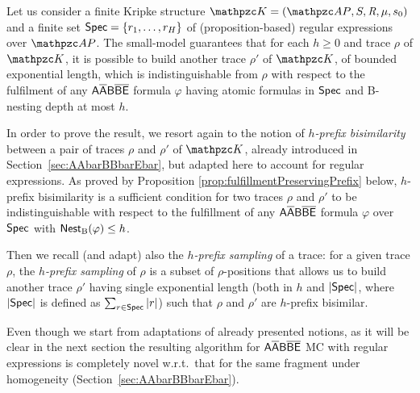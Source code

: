 Let us consider a finite Kripke structure $\Ku=\KuDef$ and a finite set $\textsf{Spec}=\{r_1,\ldots,r_H\}$ of (proposition-based)
regular expressions over $\Prop$.
The small-model guarantees that for each $h\geq 0$ and trace $\rho$ of $\Ku$,
it is possible to build another trace $\rho'$ of $\Ku$, of bounded exponential length, which is indistinguishable from $\rho$ with respect to the fulfilment of any $\mathsf{A\overline{A}B\overline{B}\overline{E}}$ formula $\varphi$ having atomic formulas in $\textsf{Spec}$ and B-nesting depth at most $h$. %

In order to prove the result, 
we resort again to the notion of
\emph{$h$-prefix bisimilarity}  between a pair of traces $\rho$ and $\rho'$ of $\Ku$,
already introduced in Section~\ref{sec:AAbarBBbarEbar}, but adapted here to account for regular expressions. 
%
As proved by Proposition \ref{prop:fulfillmentPreservingPrefix} below, $h$-prefix bisimilarity   is a sufficient condition for two traces  $\rho$ and $\rho'$ to be indistinguishable with respect to the fulfillment of any $\mathsf{A\overline{A}B\overline{B}\overline{E}}$ formula $\varphi$ over $\textsf{Spec}$ with $\operatorname{\mathsf{Nest}_B}(\varphi)\leq h$.

Then we recall (and adapt) also the \emph{$h$-prefix sampling} of a trace: for a given trace $\rho$,  the \emph{$h$-prefix sampling} of $\rho$ is a subset of $\rho$-positions that allows us to build another trace $\rho'$ having single exponential length (both in $h$ and $|\textsf{Spec}|$, where $|\textsf{Spec}|$ is defined  as  $\sum_{r\in\textsf{Spec}}|r|$) such that $\rho$ and $\rho'$ are $h$-prefix bisimilar.

Even though we start from adaptations of already presented notions,
as it will be clear in the next section the resulting algorithm for $\mathsf{A\overline{A}B\overline{B}\overline{E}}$ MC with regular expressions is completely novel w.r.t.\ that for the same fragment under homogeneity (Section~\ref{sec:AAbarBBbarEbar}).


